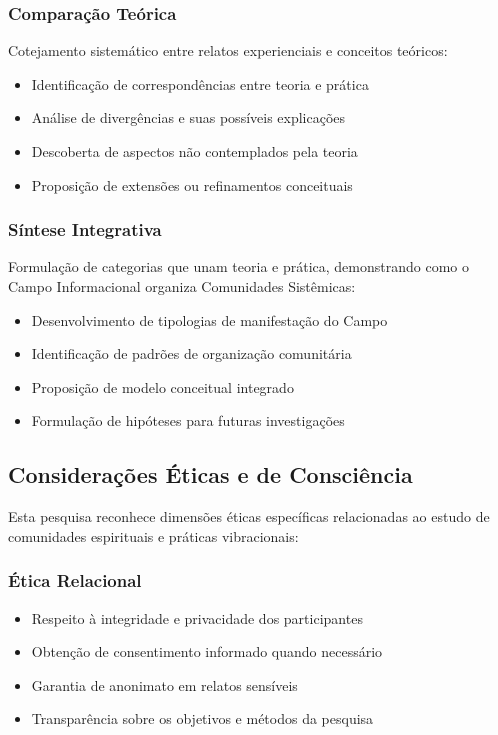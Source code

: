 \subsubsection{Comparação Teórica}
Cotejamento sistemático entre relatos experienciais e conceitos teóricos:
\begin{itemize}
    \item Identificação de correspondências entre teoria e prática
    \item Análise de divergências e suas possíveis explicações
    \item Descoberta de aspectos não contemplados pela teoria
    \item Proposição de extensões ou refinamentos conceituais
\end{itemize}

\subsubsection{Síntese Integrativa}
Formulação de categorias que unam teoria e prática, demonstrando como o Campo Informacional organiza Comunidades Sistêmicas:
\begin{itemize}
    \item Desenvolvimento de tipologias de manifestação do Campo
    \item Identificação de padrões de organização comunitária
    \item Proposição de modelo conceitual integrado
    \item Formulação de hipóteses para futuras investigações
\end{itemize}

\subsection{Considerações Éticas e de Consciência}

Esta pesquisa reconhece dimensões éticas específicas relacionadas ao estudo de comunidades espirituais e práticas vibracionais:

\subsubsection{Ética Relacional}
\begin{itemize}
    \item Respeito à integridade e privacidade dos participantes
    \item Obtenção de consentimento informado quando necessário
    \item Garantia de anonimato em relatos sensíveis
    \item Transparência sobre os objetivos e métodos da pesquisa
\end{itemize}

